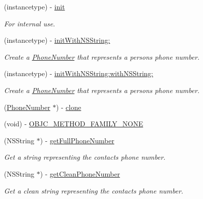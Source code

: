\begin{DoxyCompactItemize}
\item 
(instancetype) -\/ \hyperlink{interface_phone_number_a6a4fe3605e36ec25922f51bd9daf94e6}{init}
\begin{DoxyCompactList}\small\item\em For internal use. \end{DoxyCompactList}\item 
(instancetype) -\/ \hyperlink{interface_phone_number_ac699eb7f5e49db1b6f48fdcc6a37e9c1}{init\+With\+N\+S\+String\+:}
\begin{DoxyCompactList}\small\item\em Create a \hyperlink{interface_phone_number}{Phone\+Number} that represents a person\textquotesingle{}s phone number. \end{DoxyCompactList}\item 
(instancetype) -\/ \hyperlink{interface_phone_number_a23f4d5d41717eb76625fa0ee4a531aa8}{init\+With\+N\+S\+String\+:with\+N\+S\+String\+:}
\begin{DoxyCompactList}\small\item\em Create a \hyperlink{interface_phone_number}{Phone\+Number} that represents a person\textquotesingle{}s phone number. \end{DoxyCompactList}\item 
(\hyperlink{interface_phone_number}{Phone\+Number} $\ast$) -\/ \hyperlink{interface_phone_number_a601450b466aa2059097246efcf5fb4be}{clone}
\item 
(void) -\/ \hyperlink{interface_phone_number_a56840c334435bd523f7f314ebdddb313}{O\+B\+J\+C\+\_\+\+M\+E\+T\+H\+O\+D\+\_\+\+F\+A\+M\+I\+L\+Y\+\_\+\+N\+O\+N\+E}
\item 
(N\+S\+String $\ast$) -\/ \hyperlink{interface_phone_number_a526dbc20bd1812b6ff57191e6b3cbe43}{get\+Full\+Phone\+Number}
\begin{DoxyCompactList}\small\item\em Get a string representing the contact\textquotesingle{}s phone number. \end{DoxyCompactList}\item 
(N\+S\+String $\ast$) -\/ \hyperlink{interface_phone_number_a22250329c23f23cfe134cbb0eb879374}{get\+Clean\+Phone\+Number}
\begin{DoxyCompactList}\small\item\em Get a clean string representing the contact\textquotesingle{}s phone number. \end{DoxyCompactList}\item 

\end{DoxyCompactItemize}
